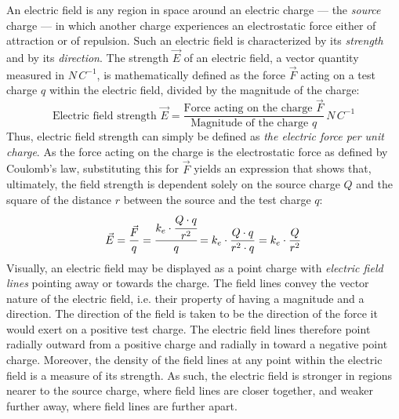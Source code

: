 An electric field is any region in space around an electric charge --- the \emph{source} charge --- in which another charge experiences an electrostatic force either of attraction or of repulsion. Such an electric field is characterized by its \emph{strength} and by its \emph{direction}. The strength $\vec{E}$ of an electric field, a vector quantity measured in $N\, C^{-1}$, is mathematically defined as the force $\vec{F}$ acting on a test charge $q$ within the electric field, divided by the magnitude of the charge: $$\text{Electric field strength } \vec{E} = \frac{\text{Force acting on the charge } \vec{F}}{\text{Magnitude of the charge } q} \,N\, C^{-1}$$ Thus, electric field strength can simply be defined as \emph{the electric force per unit charge}. As the force acting on the charge is the electrostatic force as defined by Coulomb's law, substituting this for $\vec{F}$ yields an expression that shows that, ultimately, the field strength is dependent solely on the source charge $Q$ and the square of the distance $r$ between the source and the test charge $q$: $$\vec{E} = \frac{\vec{F}}{q} = \cfrac{k_e \cdot \cfrac{Q \cdot q}{r^2}}{q} = k_e \cdot \frac{Q \cdot q}{r^2 \cdot q} = k_e \cdot \frac{Q}{r^2}$$ Visually, an electric field may be displayed as a point charge with \emph{electric field lines} pointing away or towards the charge. The field lines convey the vector nature of the electric field, i.e. their property of having a magnitude and a direction. The direction of the field is taken to be the direction of the force it would exert on a positive test charge. The electric field lines therefore point radially outward from a positive charge and radially in toward a negative point charge. Moreover, the density of the field lines at any point within the electric field is a measure of its strength. As such, the electric field is stronger in regions nearer to the source charge, where field lines are closer together, and weaker further away, where field lines are further apart.

\begin{figure}[h!]
	\centering
	\hspace{1cm}
\end{figure}

